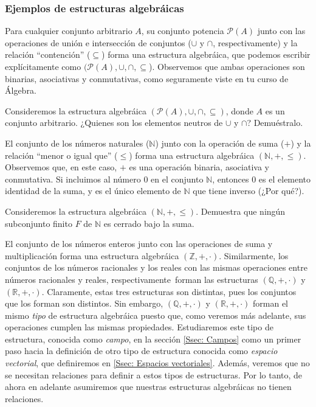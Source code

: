 \documentclass[apuntes]{subfiles}
\begin{document}
\subsubsection{Ejemplos de estructuras algebráicas} \label{Sssec: Ejemplos de estructuras algebráicas}

Para cualquier conjunto arbitrario $A$, su conjunto potencia $\mathscr{P}(A)$ junto con las operaciones de unión e intersección de conjuntos ($\cup$ y $\cap$, respectivamente) y la relación ``contención'' ($\subseteq$) forma una estructura algebráica, que podemos escribir explícitamente como $(\mathscr{P}(A),\cup,\cap,\subseteq$). Observemos que ambas operaciones son binarias, asociativas y conmutativas, como seguramente viste en tu curso de Álgebra. \\

\begin{exercise}\label{ejercicio-1}
    Consideremos la estructura algebráica $(\mathscr{P}(A),\cup,\cap,\subseteq)$, donde $A$ es un conjunto arbitrario. ¿Quienes son los elementos neutros de $\cup$ y $\cap$? Demuéstralo.
\end{exercise}

El conjunto de los números naturales ($\mathbb{N}$) junto con la operación de suma ($+$) y la relación ``menor o igual que'' ($\le$) forma una estructura algebráica $(\mathbb{N},+,\le)$. Observemos que, en este caso, $+$ es una operación binaria, asociativa y conmutativa. Si incluimos al número $0$ en el conjunto $\mathbb{N}$, entonces $0$ es el elemento identidad de la suma, y es el único elemento de $\mathbb{N}$ que tiene inverso (¿Por qué?).

\begin{exercise}\label{ejercicio-2}
    Consideremos la estructura algebráica $(\mathbb{N},+,\le)$. Demuestra que ningún subconjunto finito $F$ de $\mathbb{N}$ es cerrado bajo la suma.
\end{exercise}

El conjunto de los números enteros junto con las operaciones de suma y multiplicación forma una estructura algebráica $(\mathbb{Z},+,\cdot)$. Similarmente, los conjuntos de los números racionales y los reales con las mismas operaciones \textemdash entre números racionales y reales, respectivamente\textemdash \ forman las estructuras $(\mathbb{Q},+,\cdot)$ y $(\mathbb{R},+,\cdot)$. Claramente, estas tres estructuras son distintas, pues los conjuntos que los forman son distintos. Sin embargo, $(\mathbb{Q},+,\cdot)$ y $(\mathbb{R},+,\cdot)$ forman el mismo \emph{tipo} de estructura algebráica puesto que, como veremos más adelante, sus operaciones cumplen las mismas propiedades. Estudiaremos este tipo de estructura, conocida como \emph{campo}, en la sección \ref{Ssec: Campos} como un primer paso hacia la definición de otro tipo de estructura conocida como \emph{espacio vectorial}, que definiremos en \ref{Ssec: Espacios vectoriales}. Además, veremos que no se necesitan relaciones para definir a estos tipos de estructuras. Por lo tanto, de ahora en adelante asumiremos que nuestras estructuras algebráicas no tienen relaciones. \\
\end{document}
